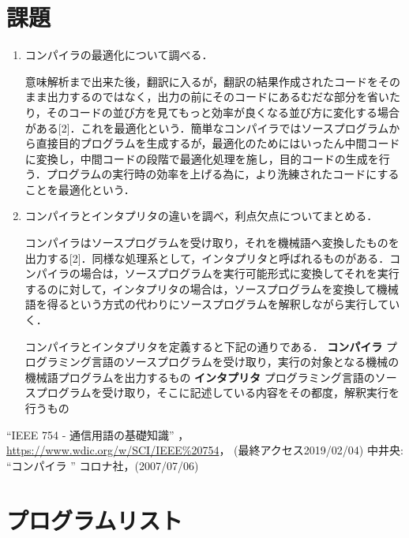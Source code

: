 \documentclass[a4j]{jsarticle}  %
\begin{document}
\section{課題}
\begin{enumerate}
\item コンパイラの最適化について調べる．

意味解析まで出来た後，翻訳に入るが，翻訳の結果作成されたコードをそのまま出力するのではなく，出力の前にそのコードにあるむだな部分を省いたり，そのコードの並び方を見てもっと効率が良くなる並び方に変化する場合がある[2]．これを最適化という．簡単なコンパイラではソースプログラムから直接目的プログラムを生成するが，最適化のためにはいったん中間コードに変換し，中間コードの段階で最適化処理を施し，目的コードの生成を行う．プログラムの実行時の効率を上げる為に，より洗練されたコードにすることを最適化という．
\item コンパイラとインタプリタの違いを調べ，利点欠点についてまとめる．

コンパイラはソースプログラムを受け取り，それを機械語へ変換したものを出力する[2]．同様な処理系として，インタプリタと呼ばれるものがある．コンパイラの場合は，ソースプログラムを実行可能形式に変換してそれを実行するのに対して，インタプリタの場合は，ソースプログラムを変換して機械語を得るという方式の代わりにソースプログラムを解釈しながら実行していく．

コンパイラとインタプリタを定義すると下記の通りである．
{\bf コンパイラ} プログラミング言語のソースプログラムを受け取り，実行の対象となる機械の機械語プログラムを出力するもの
{\bf インタプリタ} プログラミング言語のソースプログラムを受け取り，そこに記述している内容をその都度，解釈実行を行うもの
\end{enumerate}

\begin{thebibliography}{9}
 ``IEEE 754 ‐ 通信用語の基礎知識'' ，\url{https://www.wdic.org/w/SCI/IEEE%20754}，
(最終アクセス2019/02/04)
中井央: ``コンパイラ '' コロナ社，(2007/07/06)
\end{thebibliography}


\appendix
\section{プログラムリスト}
\end{document}
